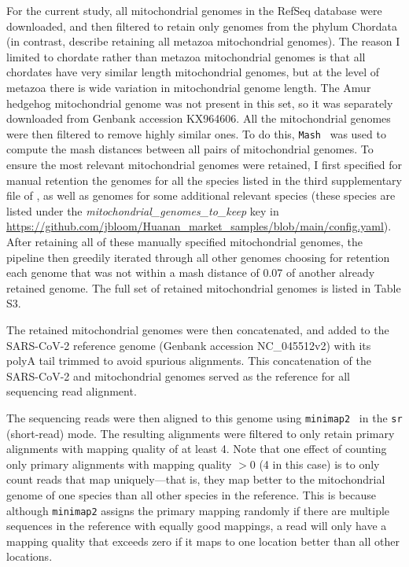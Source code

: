 \documentclass[9pt,twocolumn,twoside]{gsajnl_modified}
\begin{document}
{For the current study, all mitochondrial genomes in the RefSeq database were downloaded, and then filtered to retain only genomes from the phylum Chordata (in contrast, \citet{crits2023genetic} describe retaining all metazoa mitochondrial genomes).
The reason I limited to chordate rather than metazoa mitochondrial genomes is that all chordates have very similar length mitochondrial genomes, but at the level of metazoa there is wide variation in mitochondrial genome length.
The Amur hedgehog mitochondrial genome was not present in this set, so it was separately downloaded from Genbank accession KX964606.
All the mitochondrial genomes were then filtered to remove highly similar ones.
To do this, \texttt{Mash}~\citep{ondov2016mash} was used to compute the mash distances between all pairs of mitochondrial genomes.
To ensure the most relevant mitochondrial genomes were retained, I first specified for manual retention the genomes for all the species listed in the third supplementary file of \citet{crits2023genetic}, as well as genomes for some additional relevant species (these species are listed under the \textit{mitochondrial\_genomes\_to\_keep} key in \url{https://github.com/jbloom/Huanan_market_samples/blob/main/config.yaml}).
After retaining all of these manually specified mitochondrial genomes, the pipeline then greedily iterated through all other genomes choosing for retention each genome that was not within a mash distance of 0.07 of another already retained genome.
The full set of retained mitochondrial genomes is listed in Table S3.

The retained mitochondrial genomes were then concatenated, and added to the SARS-CoV-2 reference genome (Genbank accession NC\_045512v2) with its polyA tail trimmed to avoid spurious alignments.
This concatenation of the SARS-CoV-2 and mitochondrial genomes served as the reference for all sequencing read alignment.

The sequencing reads were then aligned to this genome using \texttt{minimap2}~\citep{li2018minimap2} in the \texttt{sr} (short-read) mode.
The resulting alignments were filtered to only retain primary alignments with mapping quality of at least 4.
Note that one effect of counting only primary alignments with mapping quality $>$0 (4 in this case) is to only count reads that map uniquely---that is, they map better to the mitochondrial genome of one species than all other species in the reference.
This is because although \texttt{minimap2} assigns the primary mapping randomly  if there are multiple sequences in the reference with equally good mappings, a read will only have a mapping quality that exceeds zero if it maps to one location better than all other locations.

}
\end{document}
